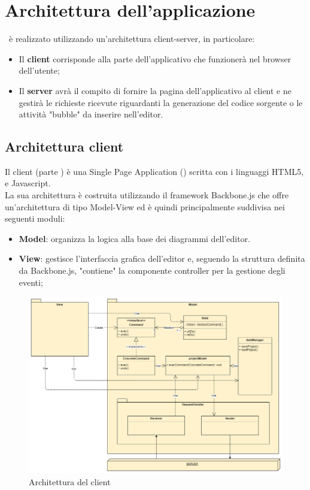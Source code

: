 \documentclass[../DefinizioneDiProdotto.tex]{subfiles}
\begin{document}
		\section{Architettura dell'applicazione}
			\progetto\ è realizzato utilizzando un'architettura client-server, in particolare:
			\begin{itemize}
				\item Il \textbf{client} corrisponde alla parte dell'applicativo che funzionerà nel
				browser dell'utente;
				\item Il \textbf{server} avrà il compito di fornire la pagina dell'applicativo al client
				e ne gestirà le richieste ricevute riguardanti la generazione del codice sorgente o le
				attività "bubble" da inserire nell'editor.
			\end{itemize}
			\subsection{Architettura client}
				Il client (parte ) è una Single Page Application () scritta con i linguaggi
				HTML5,  e Javascript.\\
				La sua architettura è costruita utilizzando il framework Backbone.js che offre
				un'architettura di tipo Model-View ed è quindi principalmente suddivisa nei seguenti moduli:
				\begin{itemize}
					\item \textbf{Model}: organizza la logica alla base dei diagrammi dell'editor.
					\item \textbf{View}: gestisce l'interfaccia grafica dell'editor e, seguendo la struttura
					definita da Backbone.js, "contiene" la componente controller per la gestione
					degli eventi; 
				\end{itemize}
				\begin{figure}[H]\label{fig:ClientSubsystem}
					\centering
					\includegraphics[scale=0.46]{Immagini/DiagrammaArchitettura/ClientSubsystem.png}
					\caption{Architettura del client}
				\end{figure}
\end{document}

